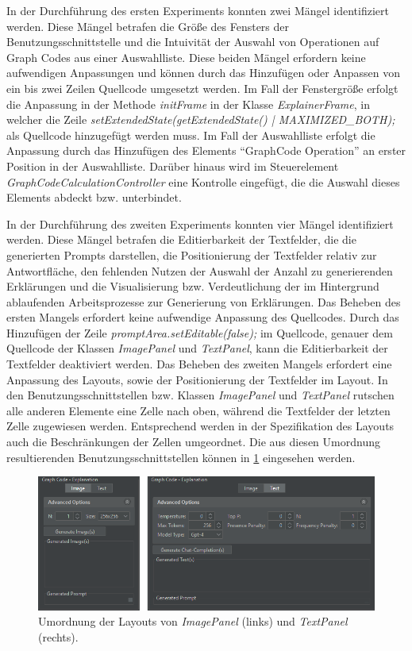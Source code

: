 In der Durchführung des ersten Experiments konnten zwei Mängel identifiziert werden.
Diese Mängel betrafen die Größe des Fensters der Benutzungsschnittstelle und die Intuivität der Auswahl von Operationen auf Graph Codes aus einer Auswahlliste.
Diese beiden Mängel erfordern keine aufwendigen Anpassungen und können durch das Hinzufügen oder Anpassen von ein bis zwei Zeilen Quellcode umgesetzt werden.
Im Fall der Fenstergröße erfolgt die Anpassung in der Methode \textit{initFrame} in der Klasse \textit{ExplainerFrame}, in welcher die Zeile \textit{setExtendedState(getExtendedState() | MAXIMIZED\_BOTH);} als Quellcode hinzugefügt werden muss.
Im Fall der Auswahlliste erfolgt die Anpassung durch das Hinzufügen des Elements \enquote{GraphCode Operation} an erster Position in der Auswahlliste.
Darüber hinaus wird im Steuerelement \textit{GraphCodeCalculationController} eine Kontrolle eingefügt, die die Auswahl dieses Elements abdeckt bzw. unterbindet.

In der Durchführung des zweiten Experiments konnten vier Mängel identifiziert werden.
Diese Mängel betrafen die Editierbarkeit der Textfelder, die die generierten Prompts darstellen, die Positionierung der Textfelder relativ zur Antwortfläche, den fehlenden Nutzen der Auswahl der Anzahl zu generierenden Erklärungen und die Visualisierung bzw. Verdeutlichung der im Hintergrund ablaufenden Arbeitsprozesse zur Generierung von Erklärungen.
Das Beheben des ersten Mangels erfordert keine aufwendige Anpassung des Quellcodes.
Durch das Hinzufügen der Zeile \textit{promptArea.setEditable(false);} im Quellcode, genauer dem Quellcode der Klassen \textit{ImagePanel} und \textit{TextPanel}, kann die Editierbarkeit der Textfelder deaktiviert werden.
Das Beheben des zweiten Mangels erfordert eine Anpassung des Layouts, sowie der Positionierung der Textfelder im Layout.
In den Benutzungsschnittstellen bzw. Klassen \textit{ImagePanel} und \textit{TextPanel} rutschen alle anderen Elemente eine Zelle nach oben, während die Textfelder der letzten Zelle zugewiesen werden.
Entsprechend werden in der Spezifikation des Layouts auch die Beschränkungen der Zellen umgeordnet.
Die aus diesen Umordnung resultierenden Benutzungsschnittstellen können in \cref{sec5:eval:subsec:adaptation:fig:new-layouts} eingesehen werden.

\begin{figure}[!ht]
  \centering
  \includegraphics[width=\textwidth]{chapter/chapter_5/new-layouts-img-txt}
  \caption[Umordnung der Layouts von \textit{ImagePanel} und \textit{TextPanel}]{Umordnung der Layouts von \textit{ImagePanel} (links) und \textit{TextPanel} (rechts).}
  \label{sec5:eval:subsec:adaptation:fig:new-layouts}
\end{figure}

